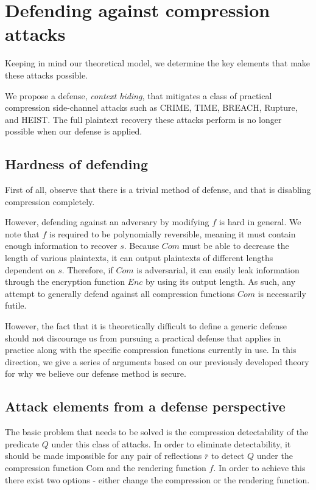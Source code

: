 \section{Defending against compression attacks}\label{sec:defense}
Keeping in mind our theoretical model, we determine the key elements that make these
attacks possible.

We propose a defense, \textit{context hiding}, that mitigates a class of
practical compression side-channel attacks such as CRIME, TIME, BREACH, Rupture,
and HEIST. The full plaintext recovery these attacks perform is no longer
possible when our defense is applied.

\subsection{Hardness of defending}
First of all, observe that there is a trivial method of defense, and that is
disabling compression completely.

However, defending against an adversary by modifying $f$ is hard in general. We
note that $f$ is required to be polynomially reversible, meaning it must contain
enough information to recover $s$. Because $Com$ must be able to decrease the
length of various plaintexts, it can output plaintexts of different lengths
dependent on $s$. Therefore, if $Com$ is adversarial, it can easily leak
information through the encryption function $Enc$ by using its output length. As
such, any attempt to generally defend against all compression functions $Com$ is
necessarily futile.

However, the fact that it is theoretically difficult to define a generic defense
should not discourage us from pursuing a practical defense that applies in
practice along with the specific compression functions currently in use. In
this direction, we give a series of arguments based on our previously developed
theory for why we believe our defense method is secure.

\subsection{Attack elements from a defense perspective}
The basic problem that needs to be solved is the compression detectability of the
predicate $Q$ under this class of attacks. In order to eliminate detectability,
it should be made impossible for any pair of reflections $\overbar{r}$ to detect
$Q$ under the compression function $\textrm{Com}$ and the rendering function
$f$. In order to achieve this there exist two options - either change the
compression or the rendering function.

